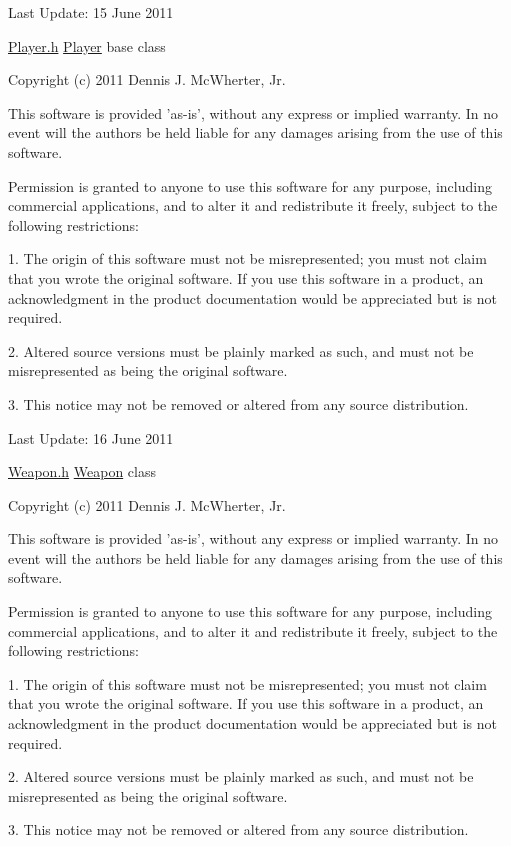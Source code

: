Last Update: 15 June 2011

\hyperlink{_player_8h_source}{Player.h} \hyperlink{class_micro_f_p_s_1_1_player}{Player} base class

Copyright (c) 2011 Dennis J. McWherter, Jr.

This software is provided 'as-\/is', without any express or implied warranty. In no event will the authors be held liable for any damages arising from the use of this software.

Permission is granted to anyone to use this software for any purpose, including commercial applications, and to alter it and redistribute it freely, subject to the following restrictions:

1. The origin of this software must not be misrepresented; you must not claim that you wrote the original software. If you use this software in a product, an acknowledgment in the product documentation would be appreciated but is not required.

2. Altered source versions must be plainly marked as such, and must not be misrepresented as being the original software.

3. This notice may not be removed or altered from any source distribution.

Last Update: 16 June 2011

\hyperlink{_weapon_8h_source}{Weapon.h} \hyperlink{class_micro_f_p_s_1_1_weapon}{Weapon} class

Copyright (c) 2011 Dennis J. McWherter, Jr.

This software is provided 'as-\/is', without any express or implied warranty. In no event will the authors be held liable for any damages arising from the use of this software.

Permission is granted to anyone to use this software for any purpose, including commercial applications, and to alter it and redistribute it freely, subject to the following restrictions:

1. The origin of this software must not be misrepresented; you must not claim that you wrote the original software. If you use this software in a product, an acknowledgment in the product documentation would be appreciated but is not required.

2. Altered source versions must be plainly marked as such, and must not be misrepresented as being the original software.

3. This notice may not be removed or altered from any source distribution.

